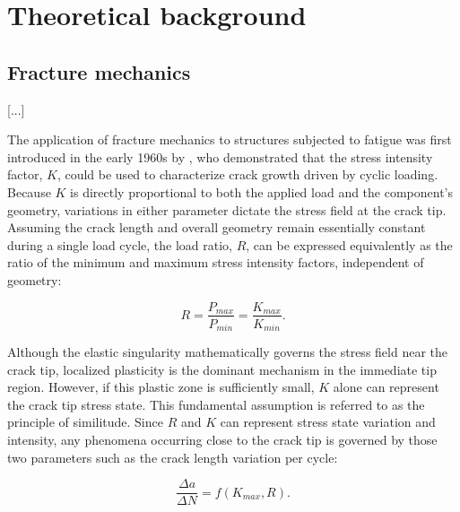 \section{Theoretical background}
\subsection{Fracture mechanics}
[...]

The application of fracture mechanics to structures subjected to fatigue was first introduced in the early 1960s by \textcite{paris1997rational}, who demonstrated that the stress intensity factor, $K$, could be used to characterize crack growth driven by cyclic loading. Because $K$ is directly proportional to both the applied load and the component's geometry, variations in either parameter dictate the stress field at the crack tip. Assuming the crack length and overall geometry remain essentially constant during a single load cycle, the load ratio, $R$, can be expressed equivalently as the ratio of the minimum and maximum stress intensity factors, independent of geometry:

\begin{equation}
	R = \frac{P_{max}}{P_{min}} = \frac{K_{max}}{K_{min}}.
\end{equation}

Although the elastic singularity mathematically governs the stress field near the crack tip, localized plasticity is the dominant mechanism in the immediate tip region. However, if this plastic zone is sufficiently small, $K$ alone can represent the crack tip stress state. This fundamental assumption is referred to as the principle of similitude. Since $R$ and $K$ can represent stress state variation and intensity, any phenomena occurring close to the crack tip is governed by those two parameters such as the crack length variation per cycle:

\begin{equation}
	\frac{\Delta a}{\Delta N} = f(K_{max}, R).
\end{equation} 

